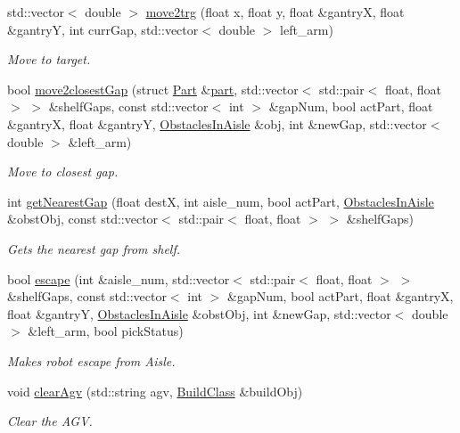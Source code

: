 \begin{DoxyCompactItemize}
std\+::vector$<$ double $>$ \hyperlink{classGantryControl_aa3b48219dcba01f5608c6a4d9ff447e9}{move2trg} (float x, float y, float \&gantryX, float \&gantryY, int curr\+Gap, std\+::vector$<$ double $>$ left\+\_\+arm)
\begin{DoxyCompactList}\small\item\em Move to target. \end{DoxyCompactList}\item 
bool \hyperlink{classGantryControl_a7254dcd957785ee836d611581d3eda46}{move2closest\+Gap} (struct \hyperlink{structPart}{Part} \&\hyperlink{utils_8h_a67ee3a5b9091664130eca8efc8b97ab9}{part}, std\+::vector$<$ std\+::pair$<$ float, float $>$ $>$ \&shelf\+Gaps, const std\+::vector$<$ int $>$ \&gap\+Num, bool act\+Part, float \&gantryX, float \&gantryY, \hyperlink{classObstaclesInAisle}{Obstacles\+In\+Aisle} \&obj, int \&new\+Gap, std\+::vector$<$ double $>$ \&left\+\_\+arm)
\begin{DoxyCompactList}\small\item\em Move to closest gap. \end{DoxyCompactList}\item 
int \hyperlink{classGantryControl_ab475e912ab1ea0d13efc10078695102e}{get\+Nearest\+Gap} (float destX, int aisle\+\_\+num, bool act\+Part, \hyperlink{classObstaclesInAisle}{Obstacles\+In\+Aisle} \&obst\+Obj, const std\+::vector$<$ std\+::pair$<$ float, float $>$ $>$ \&shelf\+Gaps)
\begin{DoxyCompactList}\small\item\em Gets the nearest gap from shelf. \end{DoxyCompactList}\item 
bool \hyperlink{classGantryControl_aa014dd433af4fc580d38639c6353e7b8}{escape} (int \&aisle\+\_\+num, std\+::vector$<$ std\+::pair$<$ float, float $>$ $>$ \&shelf\+Gaps, const std\+::vector$<$ int $>$ \&gap\+Num, bool act\+Part, float \&gantryX, float \&gantryY, \hyperlink{classObstaclesInAisle}{Obstacles\+In\+Aisle} \&obst\+Obj, int \&new\+Gap, std\+::vector$<$ double $>$ \&left\+\_\+arm, bool pick\+Status)
\begin{DoxyCompactList}\small\item\em Makes robot escape from Aisle. \end{DoxyCompactList}\item 
void \hyperlink{classGantryControl_ad7df230473058728ad07804a3d6d1b4c}{clear\+Agv} (std\+::string agv, \hyperlink{classBuildClass}{Build\+Class} \&build\+Obj)
\begin{DoxyCompactList}\small\item\em Clear the A\+GV. \end{DoxyCompactList}\item 

\end{DoxyCompactItemize}
